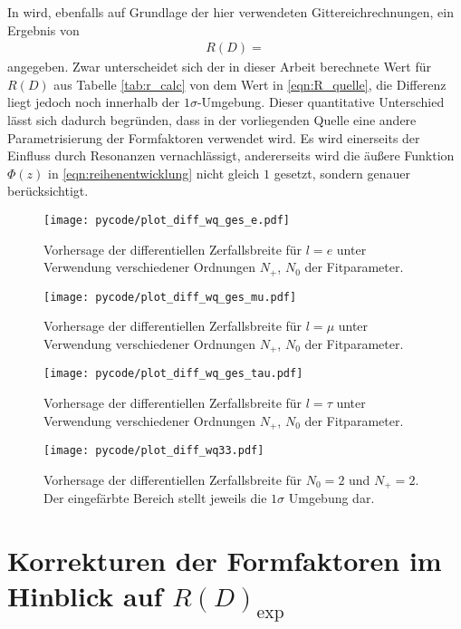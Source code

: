 In \cite{PhysRevD.92.034506} wird, ebenfalls auf Grundlage der hier verwendeten Gittereichrechnungen, ein Ergebnis von
\begin{align}
  \label{eqn:R_quelle}
  R(D) = 
\end{align}
angegeben.
Zwar unterscheidet sich der in dieser Arbeit berechnete Wert für $R(D)$ aus Tabelle \ref{tab:r_calc} von dem Wert in \eqref{eqn:R_quelle}, die Differenz liegt jedoch noch innerhalb der $\num{1}\sigma$-Umgebung.
Dieser quantitative Unterschied lässt sich dadurch begründen, dass in der vorliegenden Quelle eine andere Parametrisierung der Formfaktoren verwendet wird.
Es wird einerseits der Einfluss durch Resonanzen vernachlässigt, andererseits wird die äußere Funktion $\Phi(z)$ in \eqref{eqn:reihenentwicklung} nicht gleich $1$ gesetzt, sondern genauer berücksichtigt.

\begin{figure}
  \centering
  \texttt{[image: pycode/plot\_diff\_wq\_ges\_e.pdf]}
  \caption{Vorhersage der differentiellen Zerfallsbreite für $l=e$ unter Verwendung verschiedener Ordnungen $N_+$, $N_0$ der Fitparameter.}
  \label{fig:difwqe}
\end{figure}
\begin{figure}
  \centering
  \texttt{[image: pycode/plot\_diff\_wq\_ges\_mu.pdf]}
  \caption{Vorhersage der differentiellen Zerfallsbreite für $l=\mu$ unter Verwendung verschiedener Ordnungen $N_+$, $N_0$ der Fitparameter.}
  \label{fig:difwqmu}
\end{figure}
\begin{figure}
  \centering
  \texttt{[image: pycode/plot\_diff\_wq\_ges\_tau.pdf]}
  \caption{Vorhersage der differentiellen Zerfallsbreite für $l=\tau$ unter Verwendung verschiedener Ordnungen $N_+$, $N_0$ der Fitparameter.}
  \label{fig:difwqtau}
\end{figure}
\begin{figure}
  \centering
  \texttt{[image: pycode/plot\_diff\_wq33.pdf]}
  \caption{Vorhersage der differentiellen Zerfallsbreite für $N_0 = \num{2}$ und $N_+ = \num{2}$. Der eingefärbte Bereich stellt jeweils die $\num{1}\sigma$ Umgebung dar.}
  \label{fig:difwq33}
\end{figure}

\section{Korrekturen der Formfaktoren im Hinblick auf \texorpdfstring{${R(D)_\mathrm{exp}}$}{R(D)_exp}}

